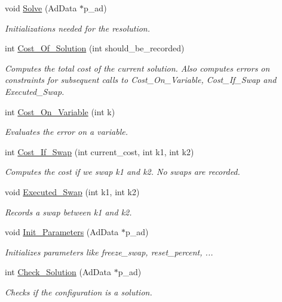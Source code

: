 \begin{DoxyCompactItemize}
\item 
void \hyperlink{classMagicSquare_a3d43d7fa15f945e20491ec1125bd0d44}{Solve} (AdData $\ast$p\_\-ad)
\begin{DoxyCompactList}\small\item\em Initializations needed for the resolution. \item\end{DoxyCompactList}\item 
int \hyperlink{classMagicSquare_a7e45a2e9c128850bfb6717613a014fff}{Cost\_\-Of\_\-Solution} (int should\_\-be\_\-recorded)
\begin{DoxyCompactList}\small\item\em Computes the total cost of the current solution. Also computes errors on constraints for subsequent calls to Cost\_\-On\_\-Variable, Cost\_\-If\_\-Swap and Executed\_\-Swap. \item\end{DoxyCompactList}\item 
int \hyperlink{classMagicSquare_ae7ededec4689d278c83dc833c3a4b248}{Cost\_\-On\_\-Variable} (int k)
\begin{DoxyCompactList}\small\item\em Evaluates the error on a variable. \item\end{DoxyCompactList}\item 
int \hyperlink{classMagicSquare_a349868bc563431930a695795e8de84ed}{Cost\_\-If\_\-Swap} (int current\_\-cost, int k1, int k2)
\begin{DoxyCompactList}\small\item\em Computes the cost if we swap k1 and k2. No swaps are recorded. \item\end{DoxyCompactList}\item 
void \hyperlink{classMagicSquare_a4764e5e4485406f07f09c13307780757}{Executed\_\-Swap} (int k1, int k2)
\begin{DoxyCompactList}\small\item\em Records a swap between k1 and k2. \item\end{DoxyCompactList}\item 
void \hyperlink{classMagicSquare_a21aa228edea478e4240fb3c27024f670}{Init\_\-Parameters} (AdData $\ast$p\_\-ad)
\begin{DoxyCompactList}\small\item\em Initializes parameters like freeze\_\-swap, reset\_\-percent, ... \item\end{DoxyCompactList}\item 
int \hyperlink{classMagicSquare_a23b9fe6d1e267d66847e8bcb2b575738}{Check\_\-Solution} (AdData $\ast$p\_\-ad)
\begin{DoxyCompactList}\small\item\em Checks if the configuration is a solution. \item\end{DoxyCompactList}\end{DoxyCompactItemize}
